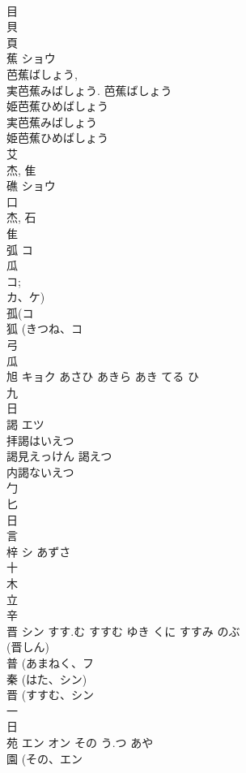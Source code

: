 \documentclass[8pt]{extreport}
\begin{document}
\begin{CJK}{UTF8}{min}
\\	目 
\\	貝 
\\	頁 
\\	蕉	ショウ		
\\	芭蕉ばしょう, 
\\	実芭蕉みばしょう.		芭蕉ばしょう
\\	姫芭蕉ひめばしょう
\\	実芭蕉みばしょう
\\	姫芭蕉ひめばしょう
\\	艾 
\\	杰, 隹 
\\	礁	ショウ		
\\	口 
\\	杰, 石 
\\	隹 
\\	弧	コ		
\\	瓜 
\\	コ; 
\\	カ、ケ) 
\\	孤(コ 
\\	狐 (きつね、コ 
\\	弓 
\\	瓜 
\\	旭	キョク	あさひ あきら あき てる ひ	
\\	九 
\\	日 
\\	謁	エツ		
\\	拝謁はいえつ 
\\	謁見えっけん 謁えつ 
\\	内謁ないえつ 
\\	勹 
\\	匕 
\\	日 
\\	言 
\\	梓	シ	あずさ	
\\	十 
\\	木 
\\	立 
\\	辛 
\\	晋	シン	すす.む すすむ ゆき くに すすみ のぶ	
\\	(晋しん)	
\\	普 (あまねく、フ 
\\	秦 (はた、シン) 
\\	晋 (すすむ、シン 
\\	一 
\\	日 
\\	苑	エン オン	その う.つ あや	
\\	園 (その、エン 

\end{CJK}
\end{document}
